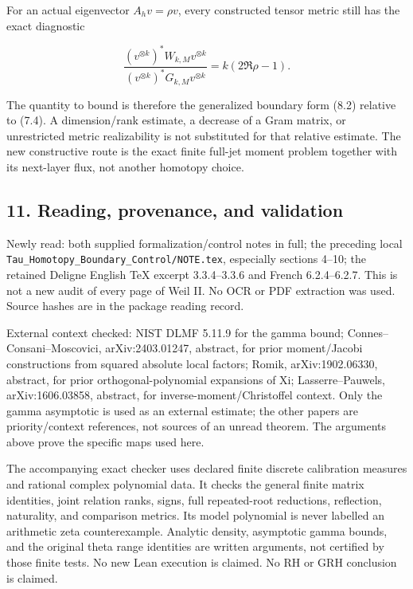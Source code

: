 \documentclass[
]{article}
\begin{document}
For an actual eigenvector \(A_hv=\rho v\), every constructed tensor
metric still has the exact diagnostic

\[\frac{(v^{\otimes k})^*W_{k,M}v^{\otimes k}}
{(v^{\otimes k})^*G_{k,M}v^{\otimes k}}
=k(2\Re\rho-1).\tag{10.3}\]

The quantity to bound is therefore the generalized boundary form (8.2)
relative to (7.4). A dimension/rank estimate, a decrease of a Gram
matrix, or unrestricted metric realizability is not substituted for that
relative estimate. The new constructive route is the exact finite
full-jet moment problem together with its next-layer flux, not another
homotopy choice.

\subsection{11. Reading, provenance, and
validation}\label{reading-provenance-and-validation}

Newly read: both supplied formalization/control notes in full; the
preceding local \texttt{Tau\_Homotopy\_Boundary\_Control/NOTE.tex},
especially sections 4--10; the retained Deligne English TeX excerpt
3.3.4--3.3.6 and French 6.2.4--6.2.7. This is not a new audit of every
page of Weil II. No OCR or PDF extraction was used. Source hashes are in
the package reading record.

External context checked: NIST DLMF 5.11.9 for the gamma bound;
Connes--Consani--Moscovici, arXiv:2403.01247, abstract, for prior
moment/Jacobi constructions from squared absolute local factors; Romik,
arXiv:1902.06330, abstract, for prior orthogonal-polynomial expansions
of Xi; Lasserre--Pauwels, arXiv:1606.03858, abstract, for
inverse-moment/Christoffel context. Only the gamma asymptotic is used as
an external estimate; the other papers are priority/context references,
not sources of an unread theorem. The arguments above prove the specific
maps used here.

The accompanying exact checker uses declared finite discrete calibration
measures and rational complex polynomial data. It checks the general
finite matrix identities, joint relation ranks, signs, full
repeated-root reductions, reflection, naturality, and comparison
metrics. Its model polynomial is never labelled an arithmetic zeta
counterexample. Analytic density, asymptotic gamma bounds, and the
original theta range identities are written arguments, not certified by
those finite tests. No new Lean execution is claimed. No RH or GRH
conclusion is claimed.
\end{document}
